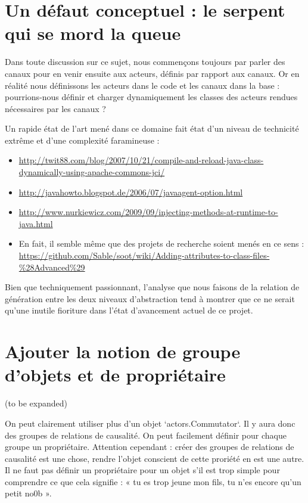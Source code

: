 \documentclass[11pt]{article}
\begin{document}
\section{Un défaut conceptuel : le serpent qui se mord la queue}

Dans toute discussion sur ce sujet, nous commençons toujours par parler des canaux pour en venir ensuite aux acteurs, définis par rapport aux canaux. Or en réalité nous définissons les acteurs dans le code et les canaux dans la base : pourrions-nous définir et charger dynamiquement les classes des acteurs rendues nécessaires par les canaux ?

Un rapide état de l'art mené dans ce domaine fait état d'un niveau de technicité extrême et d'une complexité faramineuse :
\begin{itemize}
\item \url{http://twit88.com/blog/2007/10/21/compile-and-reload-java-class-dynamically-using-apache-commons-jci/}
\item \url{http://javahowto.blogspot.de/2006/07/javaagent-option.html}
\item \url{http://www.nurkiewicz.com/2009/09/injecting-methods-at-runtime-to-java.html}
\item En fait, il semble même que des projets de recherche soient menés en ce sens : \url{https://github.com/Sable/soot/wiki/Adding-attributes-to-class-files-\%28Advanced\%29}
\end{itemize}
Bien que techniquement passionnant, l'analyse que nous faisons de la relation de génération entre les deux niveaux d'abstraction tend à montrer que ce ne serait qu'une inutile fioriture dans l'état d'avancement actuel de ce projet.

\section{Ajouter la notion de groupe d'objets et de propriétaire}

(to be expanded)

On peut clairement utiliser plus d'un objet `actors.Commutator`. Il y aura donc des groupes de relations de causalité. On peut facilement définir pour chaque groupe un propriétaire. Attention cependant : créer des groupes de relations de causalité est une chose, rendre l'objet conscient de cette proriété en est une autre. Il ne faut pas définir un propriétaire pour un objet s'il est trop simple pour comprendre ce que cela signifie : « tu es trop jeune mon fils, tu n'es encore qu'un petit no0b ».
\end{document}
